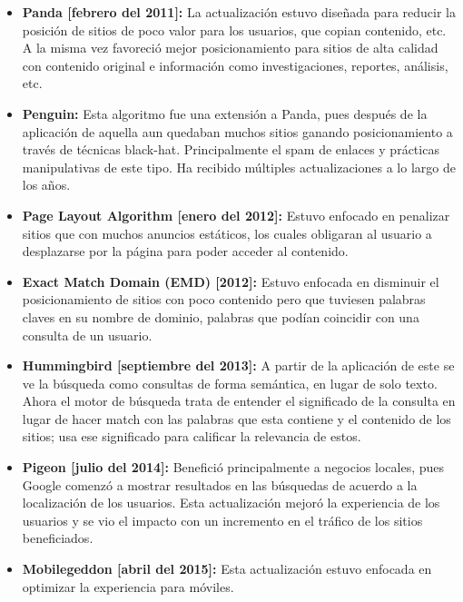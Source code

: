 \documentclass[12pt]{llncs}
\begin{document}
\begin{itemize}

\item \textbf{Panda [febrero del 2011]:} La actualización estuvo diseñada para reducir la posición de sitios de poco valor para los usuarios, que copian contenido, etc. A la misma vez favoreció mejor posicionamiento para sitios de alta calidad con contenido original e información como investigaciones, reportes, análisis, etc. \cite{panda}

\item \textbf{Penguin:} Esta algoritmo fue una extensión a Panda, pues después de la aplicación de aquella aun quedaban muchos sitios ganando posicionamiento a través de técnicas black-hat. Principalmente el spam de enlaces y prácticas manipulativas de este tipo. Ha recibido múltiples actualizaciones a lo largo de los años. \cite{penguin}

\item \textbf{Page Layout Algorithm [enero del 2012]:} Estuvo enfocado en penalizar sitios que con muchos anuncios estáticos, los cuales obligaran al usuario a desplazarse por la página para poder acceder al contenido.

\item \textbf{Exact Match Domain (EMD) [2012]:} Estuvo enfocada en disminuir el posicionamiento de sitios con poco contenido pero que tuviesen palabras claves en su nombre de dominio, palabras que podían coincidir con una consulta de un usuario.

\item \textbf{Hummingbird [septiembre del 2013]:} A partir de la aplicación de este se ve la búsqueda como consultas de forma semántica, en lugar de solo texto. Ahora el motor de búsqueda trata de entender el significado de la consulta en lugar de hacer match con las palabras que esta contiene y el contenido de los sitios; usa ese significado para calificar la relevancia de estos.

\item \textbf{Pigeon [julio del 2014]:} Benefició principalmente a negocios locales, pues Google comenzó a mostrar resultados en las búsquedas de acuerdo a la localización de los usuarios. Esta actualización mejoró la experiencia de los usuarios y se vio el impacto con un incremento en el tráfico de los sitios beneficiados.

\item \textbf{Mobilegeddon [abril del 2015]:} Esta actualización estuvo enfocada en optimizar la experiencia para móviles. \cite{mobilgeddon}


\end{itemize}
\end{document}
